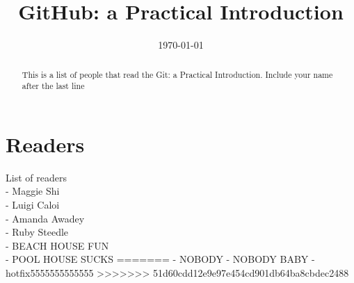 \documentclass[12pt]{article}
\begin{document}
\title{GitHub: a Practical Introduction} 

\date{\today}

\maketitle 

\begin{abstract} 

	This is a list of people that read the Git: a Practical Introduction. Include your name after the last line
	
\end{abstract}

\section{Readers}
List of readers \\
- Maggie Shi \\
- Luigi Caloi  \\
- Amanda Awadey \\
- Ruby Steedle \\
- BEACH HOUSE FUN \\
- POOL HOUSE SUCKS
=======
- NOBODY
- NOBODY BABY
- hotfix5555555555555
>>>>>>> 51d60cdd12e9e97e454cd901db64ba8cbdec2488
	 
\end{document}
